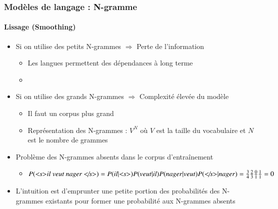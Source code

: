 \documentclass[xcolor=table]{beamer}
\begin{document}
\begin{frame}
\frametitle{Modèles de langage : N-gramme}
\framesubtitle{Lissage (Smoothing)}

\begin{itemize}
	
	\item Si on utilise des petits N-grammes $ \Longrightarrow $ Perte de l'information
	\begin{itemize}
		\item Les langues permettent des dépendances à long terme
		\item {}
	\end{itemize}

	\item Si on utilise des grands N-grammes $ \Longrightarrow $ Complexité élevée du modèle
	\begin{itemize}
		\item Il faut un corpus plus grand
		\item Représentation des N-grammes : $V^N$ où $V$ est la taille du vocabulaire et $N$ est le nombre de grammes
	\end{itemize}

	\item Problème des N-grammes absents dans le corpus d'entraînement
	\begin{itemize}
		\item $P(\text{\textit{\textless s\textgreater il veut nager \textless/s\textgreater}}) = 
		P(il|\text{\textit{\textless s\textgreater}}) P(veut|il) P(nager|veut)  P(\text{\textit{\textless/s\textgreater}}|nager) = 
		\frac{3}{4} \frac{2}{3} \frac{0}{1} \frac{1}{1} = 0
		$
	\end{itemize}
	\item L'intuition est d'emprunter une petite portion des probabilités des N-grammes existants pour former une probabilité aux N-grammes absents 
\end{itemize}

\end{frame}
\end{document}
